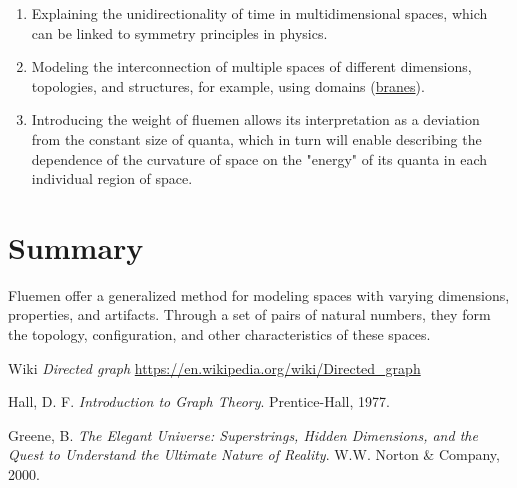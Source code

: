 \documentclass[final]{article}
\begin{document}
        \begin{enumerate}

            \item Explaining the unidirectionality of time in multidimensional 
            spaces, which can be linked to symmetry principles in physics.

            \item Modeling the interconnection of multiple spaces of different 
            dimensions, topologies, and structures, for example, using domains 
            (\href{https://en.wikipedia.org/wiki/Brane}{branes}).

            \item Introducing the weight of fluemen allows its interpretation as 
            a deviation from the constant size of quanta, which in turn will 
            enable describing the dependence of the curvature of space on the 
            "energy" of its quanta in each individual region of space.

        \end{enumerate}


    \section{Summary}

        Fluemen offer a generalized method for modeling spaces with varying 
        dimensions, properties, and artifacts. Through a set of pairs of 
        natural numbers, they form the topology, configuration, and other 
        characteristics of these spaces.

    \begin{thebibliography}{9}

         Wiki
        \textit{Directed graph}
        \url{https://en.wikipedia.org/wiki/Directed_graph}

         Hall, D. F. \textit{Introduction to Graph Theory}.
        Prentice-Hall, 1977.

         Greene, B. \textit{The Elegant Universe:
        Superstrings, Hidden Dimensions, and the Quest to Understand the
        Ultimate Nature of Reality}. W.W. Norton \& Company, 2000.

    \end{thebibliography}
\end{document}
